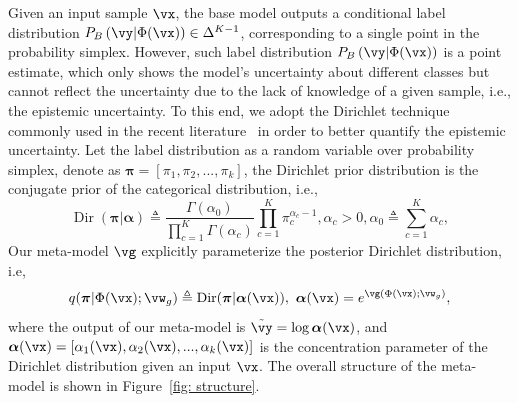 Given an input sample $\vx$, the base model outputs a conditional label distribution $P_B\left(\vy | \Phi(\vx)\right) \in \Delta^{K-1}$, corresponding to a single point in the probability simplex. However, such label distribution $P_B\left(\vy | \Phi(\vx)\right)$ is a point estimate, which only shows the model's uncertainty about different classes but cannot reflect the uncertainty due to the lack of knowledge of a given sample, i.e., the epistemic uncertainty. To this end, we adopt the Dirichlet technique commonly used in the recent literature~\citep{malinin2018predictive, malinin2019reverse, nandy2020towards, charpentier2020posterior} in order to better quantify the epistemic uncertainty. Let the label distribution as a random variable over probability simplex, denote as $\boldsymbol{\pi} = [\pi_1, \pi_2, ..., \pi_k]$, 
the Dirichlet prior distribution is the conjugate prior of the categorical distribution, i.e., 
\begin{equation}
\operatorname{Dir}(\boldsymbol{\pi} | \boldsymbol{\alpha}) \triangleq \frac{\Gamma\left(\alpha_{0}\right)}{\prod_{c=1}^{K} \Gamma\left(\alpha_{c}\right)} \prod_{c=1}^{K} \pi_{c}^{\alpha_{c}-1}, \alpha_c>0,\alpha_0 \triangleq \sum_{c=1}^K \alpha_c,
\end{equation}
Our meta-model $\vg$ explicitly parameterize the posterior Dirichlet distribution, i.e, 
\begin{equation*}
    q(\boldsymbol{\pi}|\Phi(\vx);\vw_g ) \triangleq \operatorname{Dir}(\boldsymbol{\pi} | \boldsymbol{\alpha}(\vx)), \  \boldsymbol{\alpha}(\vx) = e^{\vg\left(\Phi(\vx); \vw_g\right)},
\end{equation*}
where the output of our meta-model is $\tilde{\vy} = \log{\boldsymbol{\alpha}(\vx)}$, and $\boldsymbol{\alpha}(\vx) = [\alpha_1(\vx), \alpha_2(\vx), ..., \alpha_k(\vx)]$ is the concentration parameter of the Dirichlet distribution given an input $\vx$. The overall structure of the meta-model is shown in Figure~\ref{fig: structure}.


